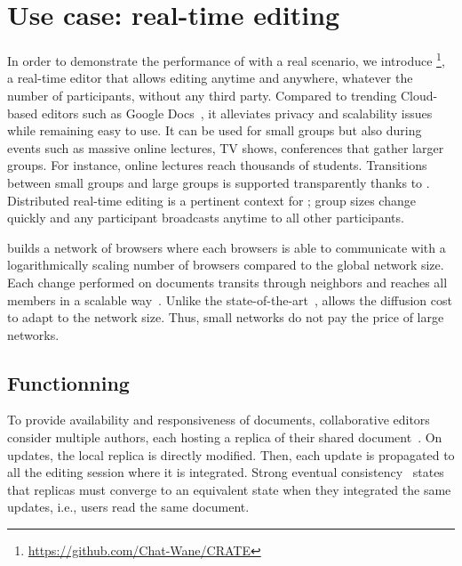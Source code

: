 
\section{Use case: real-time editing}
\label{sec:use-case}

In order to demonstrate the performance of \SPRAY with a real scenario, we
introduce \CRATE \footnote{\url{https://github.com/Chat-Wane/CRATE}}, a
real-time editor that allows editing anytime and anywhere, whatever the number
of participants, without any third party. Compared to trending Cloud-based
editors such as Google Docs~\cite{nichols1995high}, it alleviates privacy and
scalability issues while remaining easy to use.  It can be used for small groups
but also during events such as massive online lectures, TV shows, conferences
that gather larger groups. For instance, online lectures reach thousands of
students. Transitions between small groups and large groups is
supported transparently thanks to \SPRAY. Distributed real-time editing is a
pertinent context for \SPRAY; group sizes change quickly and any participant
broadcasts anytime to all other participants.

\CRATE builds a network of browsers where each browsers is able to communicate
with a logarithmically scaling number of browsers compared to the global network
size. Each change performed on documents transits through neighbors and reaches
all members in a scalable way~\cite{birman1999bimodal}. Unlike the
state-of-the-art~\cite{tolgyeski2009adaptive, voulgaris2005cyclon}, \SPRAY
allows the diffusion cost to adapt to the network size. Thus, small networks do
not pay the price of large networks.

\subsection{Functionning}

To provide availability and responsiveness of documents, collaborative editors
consider multiple authors, each hosting a replica of their shared
document~\cite{saito2005optimistic}.  On updates, the local replica is directly
modified. Then, each update is propagated to all the editing session where it is
integrated. Strong eventual consistency~\cite{bailis2013eventual} states that
replicas must converge to an equivalent state when they integrated the same
updates, i.e., users read the same document.


